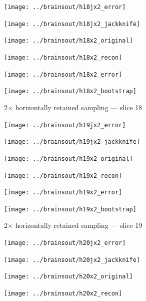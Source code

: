 \documentclass[article]{jdssv}
\begin{document}
\begin{appendix}
\begin{figure}
\begin{centering}
\parbox{\imsize}{\texttt{[image: ../brainsout/h18jx2\_error]}}
\parbox{\imsize}{\texttt{[image: ../brainsout/h18jx2\_jackknife]}}

\vspace{\vertsep}

\parbox{\imsize}{\texttt{[image: ../brainsout/h18x2\_original]}}
\parbox{\imsize}{\texttt{[image: ../brainsout/h18x2\_recon]}}

\vspace{\vertsep}

\parbox{\imsize}{\texttt{[image: ../brainsout/h18x2\_error]}}
\parbox{\imsize}{\texttt{[image: ../brainsout/h18x2\_bootstrap]}}

\end{centering}
\caption{2$\times$ horizontally retained sampling --- slice 18}
\end{figure}


\begin{figure}
\begin{centering}

\parbox{\imsize}{\texttt{[image: ../brainsout/h19jx2\_error]}}
\parbox{\imsize}{\texttt{[image: ../brainsout/h19jx2\_jackknife]}}

\vspace{\vertsep}

\parbox{\imsize}{\texttt{[image: ../brainsout/h19x2\_original]}}
\parbox{\imsize}{\texttt{[image: ../brainsout/h19x2\_recon]}}

\vspace{\vertsep}

\parbox{\imsize}{\texttt{[image: ../brainsout/h19x2\_error]}}
\parbox{\imsize}{\texttt{[image: ../brainsout/h19x2\_bootstrap]}}

\end{centering}
\caption{2$\times$ horizontally retained sampling --- slice 19}
\end{figure}


\begin{figure}
\begin{centering}

\parbox{\imsize}{\texttt{[image: ../brainsout/h20jx2\_error]}}
\parbox{\imsize}{\texttt{[image: ../brainsout/h20jx2\_jackknife]}}

\vspace{\vertsep}

\parbox{\imsize}{\texttt{[image: ../brainsout/h20x2\_original]}}
\parbox{\imsize}{\texttt{[image: ../brainsout/h20x2\_recon]}}

\vspace{\vertsep}


\end{centering}
\end{figure}
\end{appendix}
\end{document}
